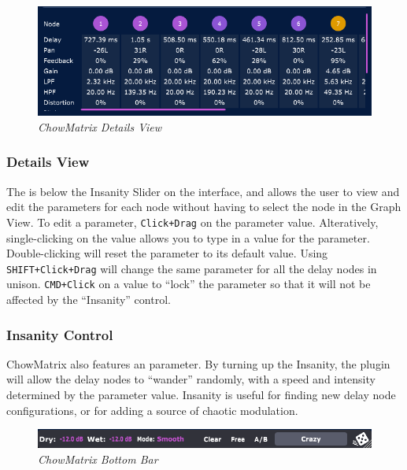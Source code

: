 \documentclass[landscape,twocolumn,a5paper]{manual}
\begin{document}
\begin{figure}[ht]
    \center
    \includegraphics[width=0.8\columnwidth]{screenshots/DetailsView.png}
    \caption{\label{fig:details_view}{\it ChowMatrix Details View}}
\end{figure}

\subsubsection{Details View}
The  is below the Insanity Slider
on the interface, and allows the user to view and edit the
parameters for each node without having to select the node
in the Graph View.
\newpar
To edit a parameter, \texttt{Click+Drag} on the parameter
value. Alteratively, single-clicking on the value allows
you to type in a value for the parameter. Double-clicking
will reset the parameter to its default value.
\newpar
\hypertarget{goto:unison}{Using \texttt{SHIFT+Click+Drag}}
will change the same parameter for all the delay nodes in
unison. \texttt{CMD+Click} on a value to ``lock'' the parameter
so that it will not be affected by the ``Insanity'' control.

\subsubsection{Insanity Control}
ChowMatrix also features an  parameter.
By turning up the Insanity, the plugin will allow the delay
nodes to ``wander'' randomly, with a speed and intensity
determined by the parameter value. Insanity is useful for
finding new delay node configurations, or for adding a source
of chaotic modulation.

\begin{figure}[ht]
    \center
    \includegraphics[width=0.95\columnwidth]{screenshots/BottomBar.png}
    \caption{\label{fig:details_view}{\it ChowMatrix Bottom Bar}}
\end{figure}
\end{document}

